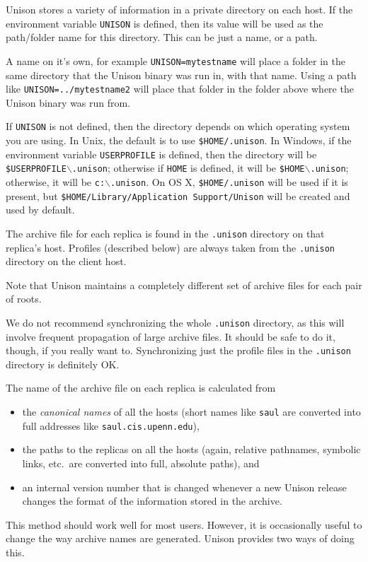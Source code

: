 \documentclass{article}
\begin{document}
Unison stores a variety of information in a private directory on each
host.  If the environment variable {\tt UNISON} is defined, then its
value will be used as the path/folder name for this directory.
This can be just a name, or a path. 

A name on it's own, for example {\tt UNISON=mytestname} will
place a folder in the same directory that the Unison binary was run
in, with that name. Using a path like {\tt UNISON=../mytestname2}
will place that folder in the folder above where the Unison binary was
run from.

If {\tt UNISON} is not defined, then the directory depends on which
operating system you are using.  In Unix, the default is to use
{\tt \$HOME/.unison}.
In Windows, if the environment variable
{\tt USERPROFILE} is defined, then the directory will be
{\tt \$USERPROFILE$\backslash$.unison};
otherwise if {\tt HOME} is defined, it will be
{\tt \$HOME$\backslash$.unison};
otherwise, it will be
{\tt c:$\backslash$.unison}.
On OS X,
{\tt \$HOME/.unison} will be used if it is present, but
{\tt \$HOME/Library/Application Support/Unison} will be created and used by
default.

The archive file for each replica is found in the {\tt .unison}
directory on that replica's host.  Profiles (described below) are
always taken from the {\tt .unison} directory on the client host.

Note that Unison maintains a completely different set of archive files
for each pair of roots.

We do not recommend synchronizing the whole {\tt .unison} directory, as this
will involve frequent propagation of large archive files.  It should be safe
to do it, though, if you really want to.  Synchronizing just the profile
files in the {\tt .unison} directory is definitely OK.



The name of the archive file on each replica is calculated from
\begin{itemize}
\item the {\em canonical names} of all the hosts (short names like
  \verb|saul| are converted into full addresses like \verb|saul.cis.upenn.edu|),
\item the paths to the replicas on all the hosts (again, relative
  pathnames, symbolic links, etc.\ are converted into full, absolute paths), and
\item an internal version number that is changed whenever a new Unison
  release changes the format of the information stored in the archive.
\end{itemize}
This method should work well for most users.  However, it is occasionally
useful to change the way archive names are generated.  Unison provides
two ways of doing this.
\end{document}
